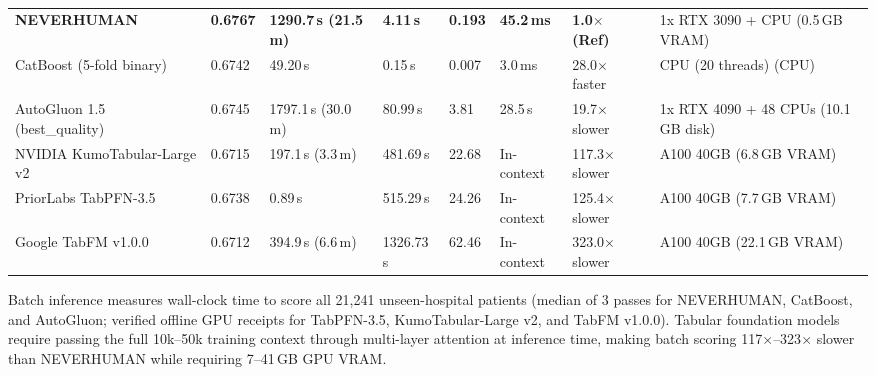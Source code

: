 \begin{table}[t]
\centering
\caption{}
\label{tab:timing}
\tablefont
\setlength{\tabcolsep}{3.2pt}
\begin{tabularx}{\textwidth}{@{}Y R{1.05cm} R{1.75cm} R{1.35cm} R{1.25cm} R{1.30cm} R{1.65cm} L{2.55cm}@{}}
\toprule
{} &  &  &  &  &  &  &  \\
\midrule
{}
\textbf{NEVERHUMAN} & \textbf{0.6767} & \textbf{1290.7\,s (21.5\,m)} & \textbf{4.11\,s} & \textbf{0.193} & \textbf{45.2\,ms} & \textbf{1.0$\times$ (Ref)} & 1x RTX 3090 + CPU (0.5\,GB VRAM) \\
CatBoost (5-fold binary) & 0.6742 & 49.20\,s & 0.15\,s & 0.007 & 3.0\,ms & 28.0$\times$ faster & CPU (20 threads) (CPU) \\
AutoGluon 1.5 (best\_quality) & 0.6745 & 1797.1\,s (30.0\,m) & 80.99\,s & 3.81 & 28.5\,s & 19.7$\times$ slower & 1x RTX 4090 + 48 CPUs (10.1\,GB disk) \\
NVIDIA KumoTabular-Large v2 & 0.6715 & 197.1\,s (3.3\,m) & 481.69\,s & 22.68 & In-context & 117.3$\times$ slower & A100 40GB (6.8\,GB VRAM) \\
PriorLabs TabPFN-3.5 & 0.6738 & 0.89\,s & 515.29\,s & 24.26 & In-context & 125.4$\times$ slower & A100 40GB (7.7\,GB VRAM) \\
Google TabFM v1.0.0 & 0.6712 & 394.9\,s (6.6\,m) & 1326.73\,s & 62.46 & In-context & 323.0$\times$ slower & A100 40GB (22.1\,GB VRAM) \\
\bottomrule
\end{tabularx}
\vspace{2pt}
{\raggedright\sffamily\fontsize{6.8}{8.5}\selectfont\color{sub}Batch inference measures wall-clock time to score all 21,241 unseen-hospital patients (median of 3 passes for NEVERHUMAN, CatBoost, and AutoGluon; verified offline GPU receipts for TabPFN-3.5, KumoTabular-Large v2, and TabFM v1.0.0). Tabular foundation models require passing the full 10k--50k training context through multi-layer attention at inference time, making batch scoring 117$\times$--323$\times$ slower than NEVERHUMAN while requiring 7--41\,GB GPU VRAM.\par}
\end{table}
